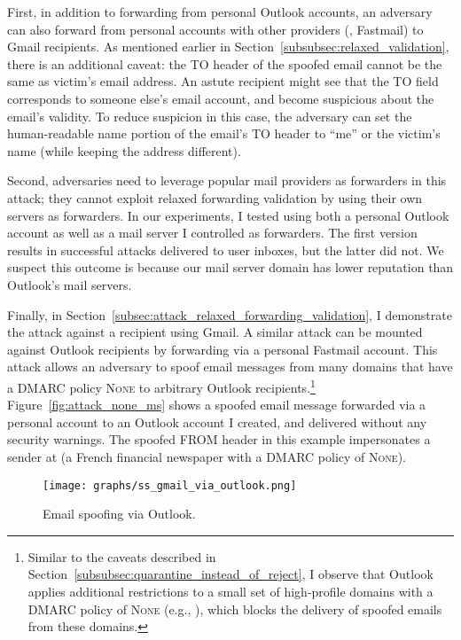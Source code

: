 First, in addition to forwarding from personal Outlook accounts, an
adversary can also forward from personal accounts with other providers
(\eg, Fastmail) to Gmail recipients.
As mentioned earlier in Section~\ref{subsubsec:relaxed_validation}, there is an additional caveat: the \textsc{TO} header of the spoofed email cannot be the same as victim's email address.
An astute recipient might see that the \textsc{TO} field corresponds to someone else's email account, and become suspicious about the email's validity.
To reduce suspicion in this case, the adversary can set the
human-readable name portion of the email's \textsc{TO} header to
``me'' or the victim's name (while keeping the address different).

Second, adversaries need to leverage popular mail providers as forwarders in this attack; they cannot exploit relaxed forwarding validation by using their own servers as forwarders.
In our experiments, I tested using both a personal Outlook account as well as a mail server I controlled as forwarders.
The first version results in successful attacks delivered to user inboxes, but the latter did not.
We suspect this outcome is because our mail server domain has lower reputation than Outlook's mail servers.

Finally, in Section~\ref{subsec:attack_relaxed_forwarding_validation}, I demonstrate the attack against a recipient using Gmail. A similar attack can be mounted against Outlook recipients by
forwarding via a personal Fastmail account. This attack allows an
adversary to spoof email messages from many domains that have a DMARC
policy \textsc{None} to arbitrary Outlook recipients.\footnote{Similar to the caveats described in
Section~\ref{subsubsec:quarantine_instead_of_reject}, I observe that Outlook applies
additional restrictions to a small set of high-profile domains with a
DMARC policy of \textsc{None} (e.g., ), which blocks the delivery of spoofed emails from these domains.}
Figure~\ref{fig:attack_none_ms} shows a spoofed email message
forwarded via a personal account to an Outlook account I created, and
delivered without any security warnings. The spoofed FROM header in
this example impersonates a sender at  (a French
financial newspaper with a DMARC policy of \textsc{None}).

\begin{figure}[t]
  \centerline{\texttt{[image: graphs/ss\_gmail\_via\_outlook.png]}}
  \centering
  \caption{Email spoofing  via Outlook.}
  \label{fig:ss_gmail_via_outlook}
  \end{figure}


